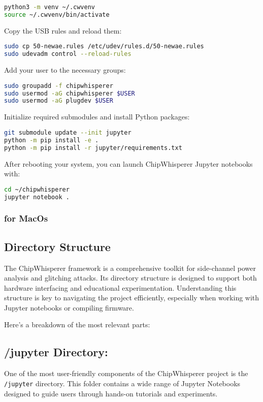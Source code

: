 \begin{lstlisting}[language=bash]
python3 -m venv ~/.cwvenv
source ~/.cwvenv/bin/activate
\end{lstlisting}

Copy the USB rules and reload them:

\begin{lstlisting}[language=bash]
sudo cp 50-newae.rules /etc/udev/rules.d/50-newae.rules
sudo udevadm control --reload-rules
\end{lstlisting}

Add your user to the necessary groups:

\begin{lstlisting}[language=bash]
sudo groupadd -f chipwhisperer
sudo usermod -aG chipwhisperer $USER
sudo usermod -aG plugdev $USER
\end{lstlisting}

Initialize required submodules and install Python packages:

\begin{lstlisting}[language=bash]
git submodule update --init jupyter
python -m pip install -e .
python -m pip install -r jupyter/requirements.txt
\end{lstlisting}

After rebooting your system, you can launch ChipWhisperer Jupyter notebooks with:

\begin{lstlisting}[language=bash]
cd ~/chipwhisperer
jupyter notebook .
\end{lstlisting}

\subsubsection{for MacOs}

\subsection{Directory Structure}
The ChipWhisperer framework is a comprehensive toolkit for side-channel power analysis and glitching attacks. Its directory structure is designed to support both hardware interfacing and educational experimentation. Understanding this structure is key to navigating the project efficiently, especially when working with Jupyter notebooks or compiling firmware.

Here’s a breakdown of the most relevant parts:

\subsection*{/jupyter Directory:}
One of the most user-friendly components of the ChipWhisperer project is the \texttt{/jupyter} directory. This folder contains a wide range of Jupyter Notebooks designed to guide users through hands-on tutorials and experiments.

